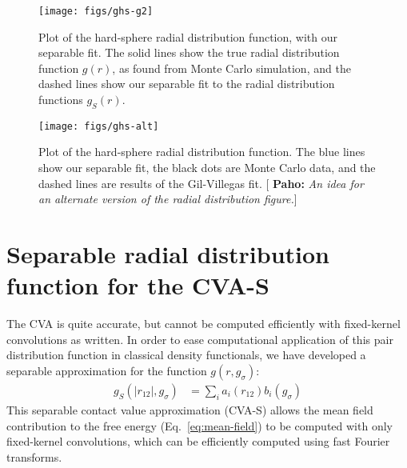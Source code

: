 \documentclass[letterpaper,twocolumn,amsmath,amssymb,pre,aps,10pt]{revtex4-1}
\newcommand{\blue}[1]{{\bf \color{blue} #1}}
\newcommand{\pahosays}[1]{{\color{red} [\blue{Paho:} \emph{#1}]}}
\begin{document}
\newcommand\kappaO{\kappa_0}
\newcommand\kappaI{\kappa_1}
\newcommand\kappaZ{\kappa_2}



\begin{figure}
  \centering
  \texttt{[image: figs/ghs-g2]}
  \caption{Plot of the hard-sphere radial distribution function, with
    our separable fit.  The solid lines show the true radial
    distribution function $g(r)$, as found from Monte Carlo
    simulation, and the dashed lines show our separable fit to the
    radial distribution functions
    $g_S(r)$.}\label{fig:radial-distribution}
\end{figure}

\begin{figure}
  \centering
  \texttt{[image: figs/ghs-alt]}
  \caption{Plot of the hard-sphere radial distribution function. The blue
    lines show our separable fit, the black dots are Monte Carlo data, and
    the dashed lines are results of the Gil-Villegas\cite{gil1997statistical}
    fit.\pahosays{An idea for an alternate version of the radial distribution
      figure.}}\label{fig:radial-distribution-alt}
\end{figure}

\section{Separable radial distribution function for the CVA-S}

The CVA is quite accurate, but cannot be computed efficiently
with fixed-kernel convolutions as written.  In order to ease
computational application of this pair distribution function in
classical density functionals, we have developed a separable
approximation for the function $g(r,g_\sigma)$:
\begin{align}
  g_S(|r_{12}|, g_\sigma) &= \sum_{i} a_i(r_{12}) b_i(g_\sigma)
\end{align}
This separable contact value approximation (CVA-S) allows the mean
field contribution to the free energy (Eq.~\ref{eq:mean-field}) to be
computed with only fixed-kernel convolutions, which can be
efficiently computed using fast Fourier transforms.
\end{document}
